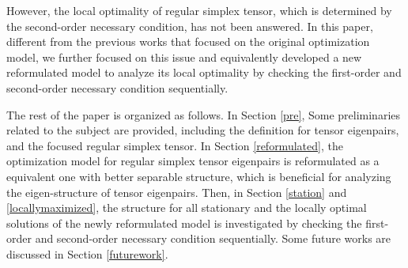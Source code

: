 \documentclass{elsarticle}
\begin{document}
However, 
the  local 
optimality of regular simplex tensor,
which is determined by the second-order  necessary condition, 
has not been answered. 
In this paper, 
different from 
the previous works that focused on the original  optimization model, 
we further 
focused on this issue 
and 
equivalently  developed 
a  new reformulated model  to analyze 
its 
local optimality
by checking the first-order and second-order necessary condition 
sequentially. 
 

%
%
%
%
%




The  rest of the paper
is organized as  follows.
In Section  \ref{pre},
Some preliminaries related to the subject are provided,  including 
the  definition  for  
tensor  eigenpairs,  and  the  focused regular simplex tensor. 
In  Section  \ref{reformulated},
the 
optimization model  for   regular simplex  tensor eigenpairs
 is  
 reformulated as a equivalent   one with better separable  structure, which is beneficial 
 for  analyzing the eigen-structure of tensor eigenpairs.
 Then, in Section  \ref{station} and \ref{locallymaximized},
 the structure for all  stationary 
 and  
 the locally optimal  solutions  of 
 the newly reformulated model 
 is investigated 
 by checking the first-order and second-order necessary condition   sequentially.
 Some future works are discussed in Section  \ref{futurework}.
 
\end{document}
